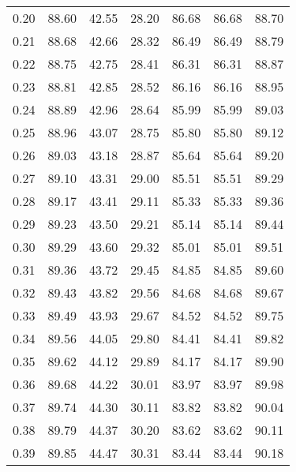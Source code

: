 \begin{tabular}{|c|c|c|c|c|c|c|}
      0.20 &     88.60 &     42.55 &      28.20 &   86.68 &      86.68 &         88.70 \\
      0.21 &     88.68 &     42.66 &      28.32 &   86.49 &      86.49 &         88.79 \\
      0.22 &     88.75 &     42.75 &      28.41 &   86.31 &      86.31 &         88.87 \\
      0.23 &     88.81 &     42.85 &      28.52 &   86.16 &      86.16 &         88.95 \\
      0.24 &     88.89 &     42.96 &      28.64 &   85.99 &      85.99 &         89.03 \\
      0.25 &     88.96 &     43.07 &      28.75 &   85.80 &      85.80 &         89.12 \\
      0.26 &     89.03 &     43.18 &      28.87 &   85.64 &      85.64 &         89.20 \\
      0.27 &     89.10 &     43.31 &      29.00 &   85.51 &      85.51 &         89.29 \\
      0.28 &     89.17 &     43.41 &      29.11 &   85.33 &      85.33 &         89.36 \\
      0.29 &     89.23 &     43.50 &      29.21 &   85.14 &      85.14 &         89.44 \\
      0.30 &     89.29 &     43.60 &      29.32 &   85.01 &      85.01 &         89.51 \\
      0.31 &     89.36 &     43.72 &      29.45 &   84.85 &      84.85 &         89.60 \\
      0.32 &     89.43 &     43.82 &      29.56 &   84.68 &      84.68 &         89.67 \\
      0.33 &     89.49 &     43.93 &      29.67 &   84.52 &      84.52 &         89.75 \\
      0.34 &     89.56 &     44.05 &      29.80 &   84.41 &      84.41 &         89.82 \\
      0.35 &     89.62 &     44.12 &      29.89 &   84.17 &      84.17 &         89.90 \\
      0.36 &     89.68 &     44.22 &      30.01 &   83.97 &      83.97 &         89.98 \\
      0.37 &     89.74 &     44.30 &      30.11 &   83.82 &      83.82 &         90.04 \\
      0.38 &     89.79 &     44.37 &      30.20 &   83.62 &      83.62 &         90.11 \\
      0.39 &     89.85 &     44.47 &      30.31 &   83.44 &      83.44 &         90.18 \\

\end{tabular}
